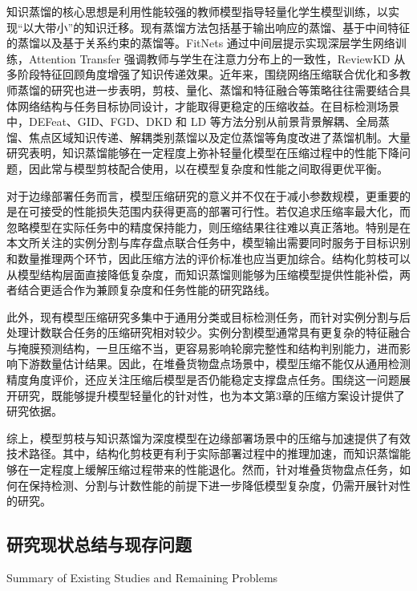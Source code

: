 知识蒸馏的核心思想是利用性能较强的教师模型指导轻量化学生模型训练，以实现“以大带小”的知识迁移\cite{hinton2015distilling}。现有蒸馏方法包括基于输出响应的蒸馏、基于中间特征的蒸馏以及基于关系约束的蒸馏等。FitNets 通过中间层提示实现深层学生网络训练，Attention Transfer 强调教师与学生在注意力分布上的一致性，ReviewKD 从多阶段特征回顾角度增强了知识传递效果\cite{romero2015fitnets,zagoruyko2017attentiontransfer,chen2021reviewkd}。近年来，围绕网络压缩联合优化和多教师蒸馏的研究也进一步表明，剪枝、量化、蒸馏和特征融合等策略往往需要结合具体网络结构与任务目标协同设计，才能取得更稳定的压缩收益\cite{ning2024compressionjointcn,wang2024dualteacherkdcn}。在目标检测场景中，DEFeat、GID、FGD、DKD 和 LD 等方法分别从前景背景解耦、全局蒸馏、焦点区域知识传递、解耦类别蒸馏以及定位蒸馏等角度改进了蒸馏机制\cite{guo2021defeat,dai2021gid,yang2022fgd,zhao2022dkd,zheng2022ld}。大量研究表明，知识蒸馏能够在一定程度上弥补轻量化模型在压缩过程中的性能下降问题，因此常与模型剪枝配合使用，以在模型复杂度和性能之间取得更优平衡。

对于边缘部署任务而言，模型压缩研究的意义并不仅在于减小参数规模，更重要的是在可接受的性能损失范围内获得更高的部署可行性。若仅追求压缩率最大化，而忽略模型在实际任务中的精度保持能力，则压缩结果往往难以真正落地。特别是在本文所关注的实例分割与库存盘点联合任务中，模型输出需要同时服务于目标识别和数量推理两个环节，因此压缩方法的评价标准也应当更加综合。结构化剪枝可以从模型结构层面直接降低复杂度，而知识蒸馏则能够为压缩模型提供性能补偿，两者结合更适合作为兼顾复杂度和任务性能的研究路线。

此外，现有模型压缩研究多集中于通用分类或目标检测任务，而针对实例分割与后处理计数联合任务的压缩研究相对较少。实例分割模型通常具有更复杂的特征融合与掩膜预测结构，一旦压缩不当，更容易影响轮廓完整性和结构判别能力，进而影响下游数量估计结果。因此，在堆叠货物盘点场景中，模型压缩不能仅从通用检测精度角度评价，还应关注压缩后模型是否仍能稳定支撑盘点任务。围绕这一问题展开研究，既能够提升模型轻量化的针对性，也为本文第3章的压缩方案设计提供了研究依据。

综上，模型剪枝与知识蒸馏为深度模型在边缘部署场景中的压缩与加速提供了有效技术路径。其中，结构化剪枝更有利于实际部署过程中的推理加速，而知识蒸馏能够在一定程度上缓解压缩过程带来的性能退化。然而，针对堆叠货物盘点任务，如何在保持检测、分割与计数性能的前提下进一步降低模型复杂度，仍需开展针对性的研究。

\subsection{研究现状总结与现存问题}{Summary of Existing Studies and Remaining Problems}

